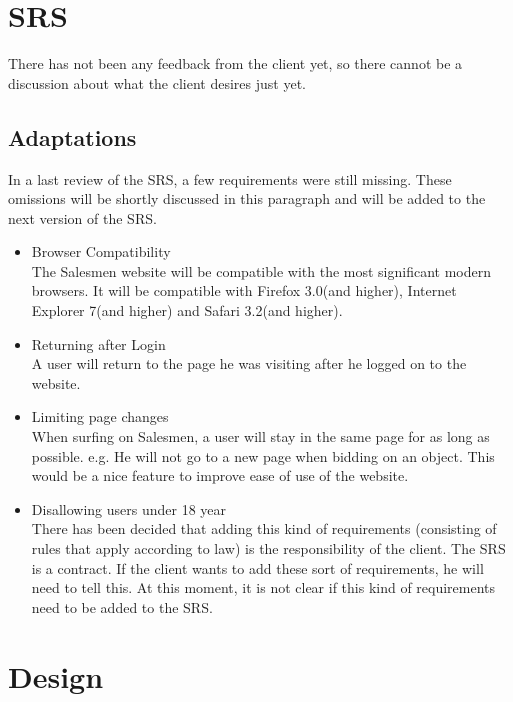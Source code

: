 \documentclass[a4paper, 12pt]{article}
\begin{document}
	\section{SRS}
There has not been any feedback from the client yet, so there cannot be a discussion about what the client desires just yet.
		\subsection{Adaptations}
In a last review of the SRS, a few requirements were still missing. These omissions will be shortly discussed in this paragraph and will be added to the next version of the SRS.
			\begin{itemize}
				\item Browser Compatibility\\
The Salesmen website will be compatible with the most significant modern browsers. It will be compatible with Firefox 3.0(and higher), Internet Explorer 7(and higher) and Safari 3.2(and higher). 
				\item Returning after Login \\
A user will return to the page he was visiting after he logged on to the website. 
				\item Limiting page changes \\
When surfing on Salesmen, a user will stay in the same page for as long as possible. e.g. He will not go to a new page when bidding on an object. This would be a nice feature to improve ease of use of the website.
				\item Disallowing users under 18 year \\
There has been decided that adding this kind of requirements (consisting of rules that apply according to law) is the responsibility of the client. The SRS is a contract. If the client wants to add these sort of requirements, he will need to tell this. At this moment, it is not clear if this kind of requirements need to be added to the SRS. 
			\end{itemize}

	\section{Design}
\end{document}

